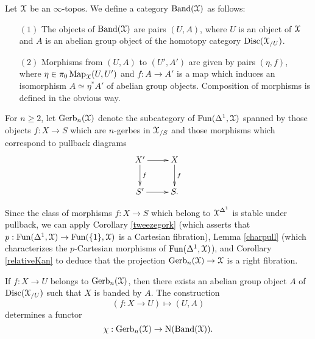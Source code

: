 \begin{notation}
Let $\operatorname{\mathcal{X}}$ be an $\infty$-topos. We define a category $\operatorname{Band}(\operatorname{\mathcal{X}})$ as follows:
\begin{itemize}
\item[$(1)$] The objects of $\operatorname{Band}(\operatorname{\mathcal{X}})$ are pairs $(U,A)$, where $U$ is an object of $\operatorname{\mathcal{X}}$
and $A$ is an abelian group object of the homotopy category $\operatorname{Disc}( \operatorname{\mathcal{X}}_{/U} )$. 
\item[$(2)$] Morphisms from $(U,A)$ to $(U',A')$ are given by pairs
$(\eta, f)$, where $\eta \in \pi_0 \operatorname{{Map}}_{\operatorname{\mathcal{X}}}(U,U')$ and $f: A \rightarrow A'$ is a map
which induces an isomorphism $A \simeq \eta^{\ast} A'$ of abelian group objects. Composition of morphisms is defined in the obvious way.
\end{itemize}

For $n \geq 2$, let $\operatorname{Gerb}_n(\operatorname{\mathcal{X}})$ denote the subcategory of $\operatorname{Fun}(\Delta^1,\operatorname{\mathcal{X}})$ spanned by those objects $f: X \rightarrow S$ which are $n$-gerbes in $\operatorname{\mathcal{X}}_{/S}$ and those morphisms which correspond to pullback diagrams
$$ \xymatrix{ X' \ar[r] \ar[d]^-{f} & X \ar[d]^-{f} \\
S' \ar[r] & S. }$$

\begin{remark}\label{sumh}
Since the class of morphisms $f: X \rightarrow S$ which belong to $\operatorname{\mathcal{X}}^{\Delta^1}$ is stable under pullback, we can apply Corollary \ref{tweezegork} (which asserts that
$p: \operatorname{Fun}(\Delta^1,\operatorname{\mathcal{X}}) \rightarrow \operatorname{Fun}( \{1\}, \operatorname{\mathcal{X}})$ is a Cartesian fibration), Lemma \ref{charpull} (which characterizes the $p$-Cartesian morphisms of $\operatorname{Fun}(\Delta^1,\operatorname{\mathcal{X}})$), and Corollary \ref{relativeKan} to deduce that the projection $\operatorname{Gerb}_{n}(\operatorname{\mathcal{X}}) \rightarrow \operatorname{\mathcal{X}}$ is a right fibration.
\end{remark}

If $f: X \rightarrow U$ belongs to $\operatorname{Gerb}_n(\operatorname{\mathcal{X}})$, then 
there exists an abelian group object $A$ of $\operatorname{Disc}( \operatorname{\mathcal{X}}_{/U} )$ such that $X$ is banded by $A$. The construction
$$ (f: X \rightarrow U) \mapsto (U,A)$$
determines a functor
$$ \chi: \operatorname{Gerb}_n(\operatorname{\mathcal{X}}) \rightarrow \operatorname{N}(\operatorname{Band}(\operatorname{\mathcal{X}})).$$


\end{notation}
